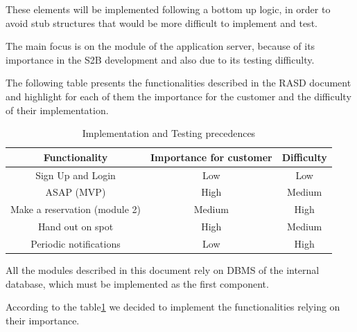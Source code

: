 \documentclass[table, 12pt]{article}
\begin{document}
These elements will be implemented following a bottom up logic, in order to avoid stub structures that would be more difficult to implement and test.

The main focus is on the module of the application server, because of its importance in the S2B development and also due to its testing difficulty.

The following table presents the functionalities described in the RASD document and highlight for each of them the importance for the customer and the difficulty of their implementation.

\begin{center}
    \begin{table}[H]
        \begin{tabular}{ | c | c | c |}
            \hline
            \textbf{Functionality}        & \textbf{Importance for customer} & \textbf{Difficulty} \\ \hline
            Sign Up and Login             & Low                              & Low                 \\ \hline
            ASAP (MVP)                    & High                             & Medium              \\\hline
            Make a reservation (module 2) & Medium                           & High                \\\hline
            Hand out on spot              & High                             & Medium              \\\hline
            Periodic notifications        & Low                              & High                \\
            \hline
        \end{tabular}
        \caption{Implementation and Testing precedences}\label{implementation_precedences}
    \end{table}
\end{center}

All the modules described in this document rely on DBMS of the internal database, which must be implemented as the first component.

According to the table\ref{implementation_precedences} we decided to implement the functionalities relying on their importance.
\end{document}
